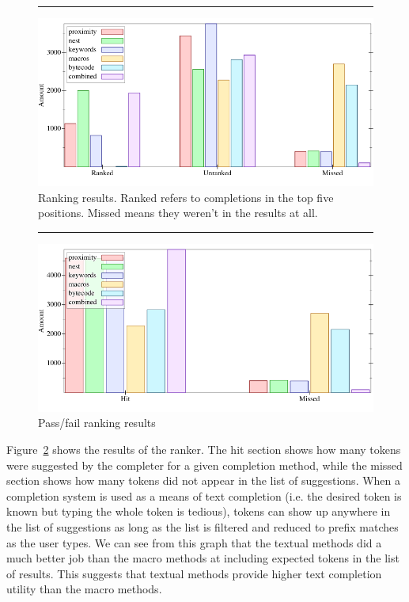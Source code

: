 \documentclass[ms,electronic,twosidetoc,letterpaper,chaptercenter,parttop,lol,lof,lot]{byumsphd}
\begin{document}
\begin{figure}[h]
\centering
\hrule
\includegraphics[width=1.0\textwidth]{../output/synthesis/ranker/Remove-combined.png}
\caption{Ranking results. Ranked refers to completions in the top five positions. Missed means they weren't in the results at all.}
\label{fig:ranker-combined}
\end{figure}

\begin{figure}[h]
\centering
\hrule
\includegraphics[width=1.0\textwidth]{../output/synthesis/ranker/Remove-uber-combined.png}
\caption{Pass/fail ranking results}
\label{fig:ranker-uber-combined}
\end{figure}

Figure~\ref{fig:ranker-uber-combined} shows the results of the ranker.
The hit section shows how many tokens were suggested by the completer for a given completion method, while the missed section shows how many tokens did not appear in the list of suggestions.
When a completion system is used as a means of text completion (i.e. the desired token is known but typing the whole token is tedious), tokens can show up anywhere in the list of suggestions as long as the list is filtered and reduced to prefix matches as the user types.
We can see from this graph that the textual methods did a much better job than the macro methods at including expected tokens in the list of results.
This suggests that textual methods provide higher text completion utility than the macro methods.
\end{document}

